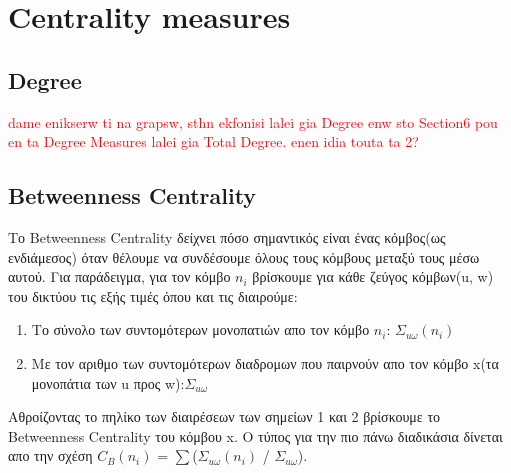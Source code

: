 \documentclass[12pt]{article}
\begin{document}
	
	
	
	
	\newpage
	\section{Centrality measures}
	
	\subsection{Degree}
	\textcolor{red}{dame enikserw ti na grapsw, sthn ekfonisi lalei gia Degree enw sto Section6 pou en ta Degree Measures lalei gia Total Degree. enen idia touta ta 2?}
	
	\subsection{Betweenness Centrality}
	Το Betweenness Centrality δείχνει πόσο σημαντικός είναι ένας κόμβος(ως ενδιάμεσος) όταν θέλουμε να συνδέσουμε όλους τους κόμβους μεταξύ τους μέσω αυτού. Για παράδειγμα, για τον κόμβο \(n_i\) βρίσκουμε για κάθε ζεύγος κόμβων(u, w) του δικτύου τις εξής τιμές όπου και τις διαιρούμε:
	\begin{enumerate}
		\item Το σύνολο των συντομότερων μονοπατιών απο τον κόμβο \(n_i\): \( \Sigma_{u \omega}(n_i) \)
		\item Με τον αριθμο των συντομότερων διαδρομων που παιρνούν απο τον κόμβο x(τα μονοπάτια των u προς w):\( \Sigma_{u \omega} \)
	\end{enumerate}
	Αθροίζοντας το πηλίκο των διαιρέσεων των σημείων 1 και 2 βρίσκουμε το Betweenness Centrality του κόμβου x.
	Ο τύπος για την πιο πάνω διαδικάσια δίνεται απο την σχέση \(C_B(n_i)\) = $\sum$(\( \Sigma_{u \omega}(n_i) \) / \( \Sigma_{u \omega} \)).
	
\end{document}
